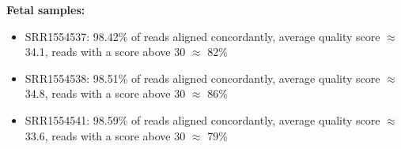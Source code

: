 \documentclass[paper=a4, fontsize=11pt]{scrartcl} %
\begin{document}
\textbf{Fetal samples:}
\begin{itemize}
    \item SRR1554537: 98.42\% of reads aligned concordantly, average quality
      score $\approx$ 34.1, reads with a score above 30 $\approx$ 82\%
    \item SRR1554538: 98.51\% of reads aligned concordantly, average quality
      score $\approx$ 34.8, reads with a score above 30 $\approx$ 86\%
    \item SRR1554541: 98.59\% of reads aligned concordantly, average quality
      score $\approx$ 33.6, reads with a score above 30 $\approx$ 79\%
\end{itemize}
\end{document}

